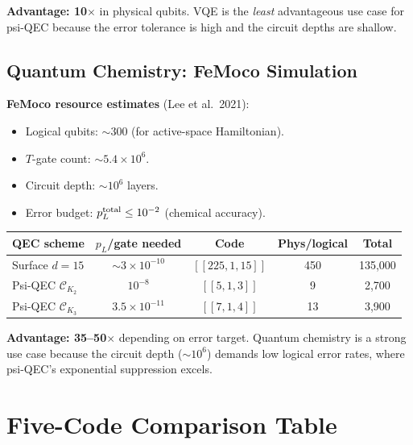 \documentclass[11pt]{article}
\theoremstyle{definition}
\theoremstyle{remark}
\newcommand{\CK}{\mathcal{C}_K}
\newcommand{\ee}[1]{\times 10^{#1}}
\begin{document}
\textbf{Advantage: 10$\times$} in physical qubits.  VQE is the
\emph{least} advantageous use case for psi-QEC because the error
tolerance is high and the circuit depths are shallow.

\subsection{Quantum Chemistry: FeMoco Simulation}
\label{sec:femoco}

\textbf{FeMoco resource estimates} (Lee et al.\ 2021):
\begin{itemize}[nosep]
  \item Logical qubits: $\sim 300$ (for active-space Hamiltonian).
  \item $T$-gate count: $\sim 5.4\ee{6}$.
  \item Circuit depth: $\sim 10^6$ layers.
  \item Error budget: $p_L^{\rm total} \leq 10^{-2}$ (chemical accuracy).
\end{itemize}

\begin{center}
\begin{tabular}{@{}lcccc@{}}
\toprule
QEC scheme & $p_L$/gate needed & Code & Phys/logical & Total \\
\midrule
Surface $d=15$ & $\sim 3\ee{-10}$ & $[[225,1,15]]$ & 450 & 135{,}000 \\
Psi-QEC $\CK_2$ & $10^{-8}$ & $[[5,1,3]]$ & 9 & 2{,}700 \\
Psi-QEC $\CK_3$ & $3.5\ee{-11}$ & $[[7,1,4]]$ & 13 & 3{,}900 \\
\bottomrule
\end{tabular}
\end{center}

\textbf{Advantage: 35--50$\times$} depending on error target.
Quantum chemistry is a strong use case because the circuit depth
($\sim 10^6$) demands low logical error rates, where psi-QEC's
exponential suppression excels.

\section{Five-Code Comparison Table}
\label{sec:five-code}
\end{document}
